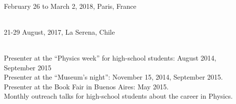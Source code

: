 \documentclass[10pt]{cv}
\newcommand\tab[1][1cm]{\hspace*{#1}}
\begin{document}
\begin{llist}
\begin{etaremune}[leftmargin=10pt]
\end{etaremune}

\renewcommand{\labelenumi}{D\theenumi}
\begin{etaremune}[leftmargin=10pt]

\item
  \\
February 26 to March 2, 2018, Paris, France

\item
  \\
21-29 August, 2017, La Serena, Chile

\clearpage

\end{etaremune}



\\
Presenter at the ``Physics week'' for high-school students: August 2014, September 2015\\
Presenter at the ``­Museum's night'':  November 15, 2014, September 2015.\\
Presenter at the Book Fair in Buenos Aires: May 2015.\\
Monthly outreach talks for high-school students about the career in Physics.



\end{llist}
\end{document}
